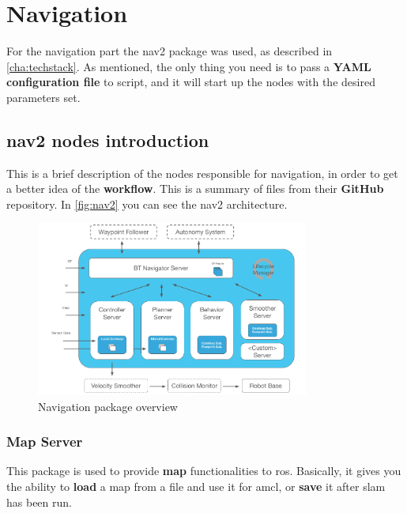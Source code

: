 \chapter{Navigation}
\label{cha:navigation}

For the navigation part the \acrshort{nav2} package was used, as described in \autoref{cha:techstack}. As mentioned, the only thing you need is to pass a \textbf{YAML configuration file} to  script, and it will start up the nodes with the desired parameters set.

\section{\acrshort{nav2} nodes introduction}

This is a brief description of the nodes responsible for navigation, in order to get a better idea of the \textbf{workflow}. This is a summary of  files from their \textbf{GitHub} repository\cite{nav2github}. In \autoref{fig:nav2} you can see the \acrshort{nav2} architecture.

\bigskip

\begin{figure}[h]
    \centering
    \includegraphics[width=0.8\textwidth]{images/nav2_architecture}
    \caption{Navigation package overview}
    \label{fig:nav2}
\end{figure}

\subsection{Map Server}

This package is used to provide \textbf{map} functionalities to \acrshort{ros}. Basically, it gives you the ability to \textbf{load} a map from a file and use it for \acrshort{amcl}, or \textbf{save} it after \acrshort{slam} has been run.

